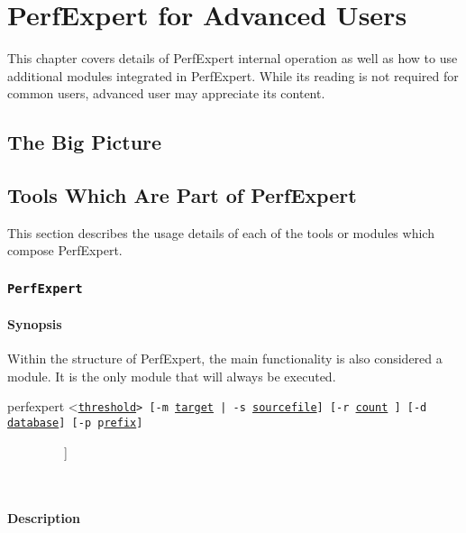 \chapter{PerfExpert for Advanced Users}

This chapter covers details of PerfExpert internal operation as well as how to use additional modules integrated
in PerfExpert. While its reading is not required for common users, advanced user may appreciate its content.

\section{The Big Picture}

\section{Tools Which Are Part of PerfExpert}

This section describes the usage details of each of the tools or modules which compose PerfExpert.

\subsection{\texttt{PerfExpert}}

\subsubsection{Synopsis}

Within the structure of PerfExpert, the main functionality is also considered a module. It is the only module
that will always be executed.

\btt perfexpert <\tt\underline{threshold}\btt> [-m \tt\underline{tar}g\underline{et} \btt | -s \tt\underline{sourcefile}\btt] [-r \tt\underline{count} \btt] [-d \tt\underline{database}\btt] [-p \tt p\underline{refix}\btt]\par
\ \ \ \ \ \ \ \ \  \btt[-k \tt\underline{card} \btt[-P \tt p\underline{refix}\btt] [-B \tt\underline{before}\btt] [-A \tt\underline{after}\btt]]\par
\ \ \ \ \ \ \ \ \ \btt[-gchv]\par
\normalfont

\subsubsection{Description}

